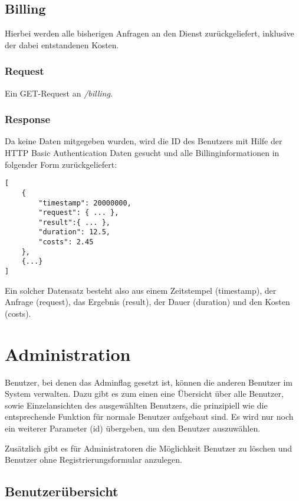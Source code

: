 \documentclass[ngerman]{scrartcl}
\begin{document}
	\subsection{Billing}
	
	Hierbei werden alle bisherigen Anfragen an den Dienst zurückgeliefert, inklusive der dabei entstandenen Kosten.
	
		\subsubsection*{Request}
		
		Ein GET-Request an \textit{/billing}.
		
		\subsubsection*{Response}
		
		Da keine Daten mitgegeben wurden, wird die ID des Benutzers mit Hilfe der HTTP Basic Authentication Daten gesucht und alle Billinginformationen in folgender Form zurückgeliefert:
		
		\begin{lstlisting}
[
	{
		"timestamp": 20000000,
		"request": { ... },
		"result":{ ... },
		"duration": 12.5,
		"costs": 2.45
	},
	{...}
]
		\end{lstlisting}
		
		Ein solcher Datensatz besteht also aus einem Zeitstempel (timestamp), der Anfrage (request), das Ergebnis (result), der Dauer (duration) und den Kosten (costs).
	

\section{Administration}

Benutzer, bei denen das Adminflag gesetzt ist, können die anderen Benutzer im System verwalten. 
Dazu gibt es zum einen eine Übersicht über alle Benutzer, sowie Einzelansichten des ausgewählten Benutzers, die prinzipiell wie die entsprechende Funktion für normale Benutzer aufgebaut sind.
Es wird nur noch ein weiterer Parameter (id) übergeben, um den Benutzer auszuwählen.

Zusätzlich gibt es für Administratoren die Möglichkeit Benutzer zu löschen und Benutzer ohne Registrierungsformular anzulegen.

	\subsection{Benutzerübersicht}
	
\end{document}
